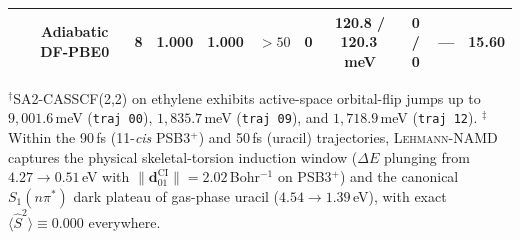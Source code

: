 \documentclass[10pt,twocolumn]{article}
\theoremstyle{natthm}
\newcommand{\leh}{\textsc{Lehmann-NAMD}}
\newcommand{\Ssq}{\langle\hat{S}^2\rangle}
\newcommand{\dCI}{\mathbf{d}_{01}^{\mathrm{CI}}}
\begin{document}
\begin{table}[t!]
{\begin{tabular}{@{}lcccccccccc@{}}
 & Adiabatic DF-PBE0 & 8 & 1.000 & 1.000 & $>50$ & 0 & 120.8 / 120.3\,meV & 0 / 0 & --- & 15.60 \\
\bottomrule
\end{tabular}}
\par\vspace{2pt}
{\raggedright\sffamily\fontsize{6.4}{7.7}\selectfont
$^\dagger$SA2-CASSCF(2,2) on ethylene exhibits active-space orbital-flip jumps up to $9{,}001.6$\,meV (\texttt{traj 00}), $1{,}835.7$\,meV (\texttt{traj 09}), and $1{,}718.9$\,meV (\texttt{traj 12}).
$^\ddagger$Within the 90\,fs (11-\emph{cis} PSB3$^+$) and 50\,fs (uracil) trajectories, \leh{} captures the physical skeletal-torsion induction window ($\Delta E$ plunging from $4.27\to 0.51$\,eV with $\|\dCI\|=2.02$\,Bohr$^{-1}$ on PSB3$^+$) and the canonical $S_1(n\pi^*)$ dark plateau of gas-phase uracil ($4.54\to 1.39$\,eV), with exact $\Ssq\equiv 0.000$ everywhere.\par}
\end{table}

\end{document}
